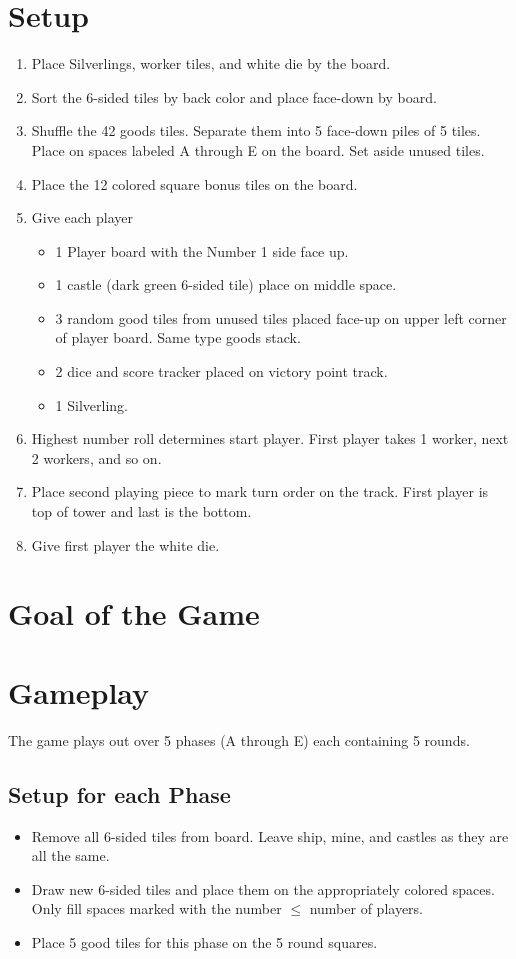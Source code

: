 \documentclass[12pt]{article}
\newenvironment{enumerateCustom}
{\begin{enumerate}
  \setlength{\itemsep}{1pt}
  \setlength{\parskip}{0pt}
  \setlength{\parsep}{0pt}}
{\end{enumerate}}
\newenvironment{itemizeCustom}
{\begin{itemize}
  \setlength{\itemsep}{1pt}
  \setlength{\parskip}{0pt}
  \setlength{\parsep}{0pt}}
{\end{itemize}}
\begin{document}
\begin{multicols*}{2}

\section*{Setup}
\begin{enumerateCustom}
	\item Place Silverlings, worker tiles, and white die by the board.
	\item Sort the 6-sided tiles by back color and place face-down by board.
	\item Shuffle the 42 goods tiles. Separate them into 5 face-down piles of 5 tiles. Place on spaces labeled A through E on the board. Set aside unused tiles.
	\item Place the 12 colored square bonus tiles on the board.
	\item Give each player
		\begin{itemizeCustom}
			\item 1 Player board with the Number 1 side face up.
			\item 1 castle (dark green 6-sided tile) place on middle space.
			\item 3 random good tiles from unused tiles placed face-up on upper left corner of player board. Same type goods stack.
			\item 2 dice and score tracker placed on victory point track.
			\item 1 Silverling.
		\end{itemizeCustom}
	\item Highest number roll determines start player. First player takes 1 worker, next 2 workers, and so on. 
	\item Place second playing piece to mark turn order on the track. First player is top of tower and last is the bottom.
	\item Give first player the white die.
\end{enumerateCustom}
\section*{Goal of the Game}
\section*{Gameplay}
The game plays out over 5 phases (A through E) each containing 5 rounds.
\subsection*{Setup for each Phase}
\begin{itemizeCustom}
	\item Remove all 6-sided tiles from board. Leave ship, mine, and castles as they are all the same.
	\item Draw new 6-sided tiles and place them on the appropriately colored spaces. Only fill spaces marked with the number $\le$ number of players.
	\item Place 5 good tiles for this phase on the 5 round squares.
\end{itemizeCustom}


\end{multicols*}
\end{document}

